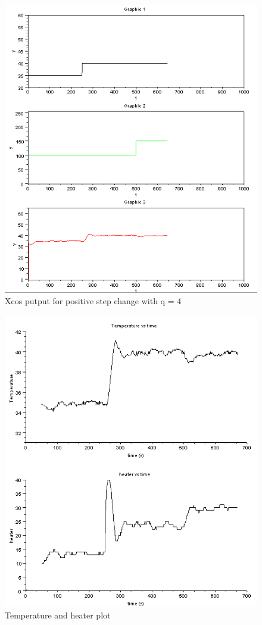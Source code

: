 \begin{figure}[H]
\centering
  \includegraphics[width=0.8\linewidth]{mpc/3_3.PNG}
  \caption{Xcos putput for positive step change with q = 4}
\end{figure}
\begin{figure}[H]
\centering
  \includegraphics[width=0.8\linewidth]{mpc/3_3_heater_final.png}
  \caption{Temperature and heater plot}
\end{figure}


